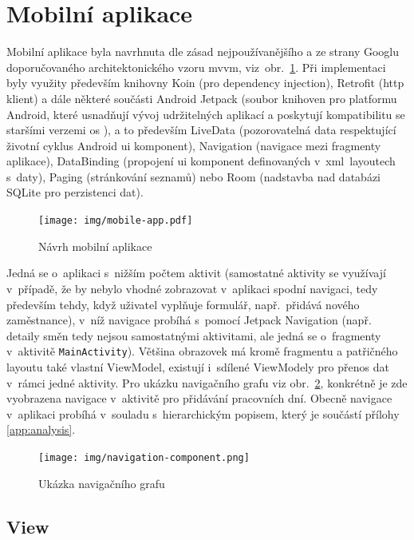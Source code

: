 \documentclass[twoside]{ctuthesis}
\begin{document}
\section{Mobilní aplikace}

Mobilní aplikace byla navrhnuta dle zásad nejpoužívanějšího a ze strany Googlu doporučovaného architektonického vzoru \acrshort{mvvm}, viz~obr.~\ref{fig:mobile-app}. Při implementaci byly využity především knihovny Koin (pro dependency injection), Retrofit (\acrshort{http} klient) a dále některé součásti Android Jetpack (soubor knihoven pro platformu Android, které usnadňují vývoj udržitelných aplikací a poskytují kompatibilitu se staršími verzemi \acrshort{os} \cite{android2020jetpack}), a to především LiveData (pozorovatelná data respektující životní cyklus Android \acrshort{ui} komponent), Navigation (navigace mezi fragmenty aplikace), DataBinding (propojení \acrshort{ui} komponent definovaných v~\acrshort{xml}~layoutech s~daty), Paging (stránkování seznamů) nebo Room (nadstavba nad databázi SQLite pro perzistenci dat).

\begin{figure}[h]
	\texttt{[image: img/mobile-app.pdf]}
	\caption{Návrh mobilní aplikace}
	\label{fig:mobile-app}
\end{figure}

Jedná se o~aplikaci s~nižším počtem aktivit (samostatné aktivity se využívají v~případě, že by nebylo vhodné zobrazovat v~aplikaci spodní navigaci, tedy především tehdy, když uživatel vyplňuje formulář, např.~přidává nového zaměstnance), v~níž navigace probíhá s~pomocí Jetpack Navigation (např. detaily směn tedy nejsou sa\-mos\-tat\-ný\-mi aktivitami, ale jedná se o~fragmenty v~aktivitě \texttt{MainActivity}). Většina obrazovek má kromě fragmentu a patřičného layoutu také vlastní ViewModel, existují i~sdílené ViewModely pro přenos dat v~rámci jedné aktivity. Pro ukázku navigačního grafu viz obr.~\ref{fig:navigation-graph}, konkrétně je zde vyobrazena navigace v~aktivitě pro přidávání pracovních dní. Obecně navigace v~aplikaci probíhá v~souladu s~hierarchickým popisem, který je součástí přílohy \ref{app:analysis}.

\begin{figure}[h]
	\texttt{[image: img/navigation-component.png]}
	\caption{Ukázka navigačního grafu}
	\label{fig:navigation-graph}
\end{figure}

\subsection{View}
\end{document}
